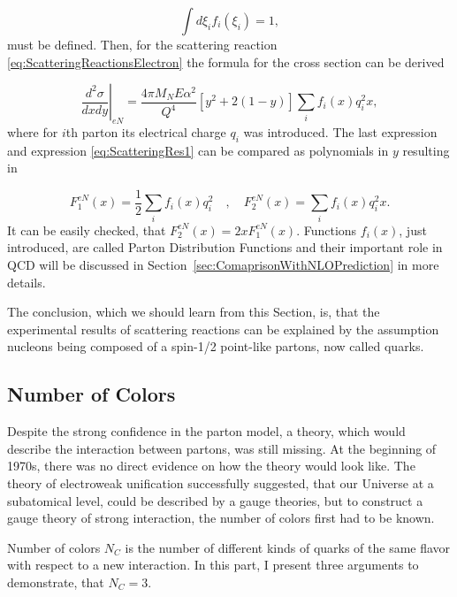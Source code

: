 \begin{equation}
  \int d\xi_i f_i(\xi_i) = 1,
  \label{eq:PartonDensityFunctionsNormalization}
\end{equation}
must be defined. Then, for the scattering reaction
\eqref{eq:ScatteringReactionsElectron} the formula for the cross section
can be derived

\begin{equation}
  \left. \frac{d^2\sigma}{dxdy} \right|_{eN} =
  \frac{4 \pi M_N E \alpha^2}{Q^4} \left[ y^2 + 2 ( 1 - y ) \right]
  \sum_i f_i(x) q_i^2 x,
  \label{eg:ScatteringRes2}
\end{equation}
where for $i$th parton its electrical charge $q_i$ was introduced. The last
expression and expression \eqref{eq:ScatteringRes1} can be compared as polynomials in $y$
resulting in

\begin{equation}
  F_1^{eN}(x) = \frac{1}{2} \sum_i f_i(x)q_i^2
  \quad , \quad
  F_2^{eN}(x) = \sum_i f_i(x) q_i^2 x.
  \label{eq:StructureFunctionAndPDF}
\end{equation}
It can be easily checked, that $F_2^{eN}(x) = 2 x F_1^{eN}(x)$. Functions
$f_i(x)$, just introduced, are called Parton Distribution Functions and their
important role in QCD will be discussed in
Section~\ref{sec:ComaprisonWithNLOPrediction} in more details.

The conclusion, which we should learn from this Section, is, that the
experimental results of scattering reactions can be explained by the assumption
nucleons being composed of a spin-1/2 point-like partons, now called quarks. 

\subsection{Number of Colors}

Despite the strong confidence in the parton model, a theory, which would describe the
interaction between partons, was still missing. At the beginning of 1970s, there
was no direct evidence on how the theory would look like.
The theory of electroweak unification successfully suggested, that our Universe
at a subatomical level, could be described by a gauge theories, but 
to construct a gauge theory of strong interaction, the number of colors first had
to be known.

Number of colors $N_C$ is the number of different kinds of quarks of the same
flavor with respect to a new interaction. In this part, I present three arguments 
to demonstrate, that $N_C = 3$.

